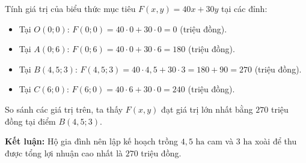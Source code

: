 \documentclass[12pt,a4paper]{article}
\begin{document}
Tính giá trị của biểu thức mục tiêu $F(x, y) = 40x + 30y$ tại các đỉnh:
\begin{itemize}[leftmargin=0.5cm, itemsep=1pt, topsep=1pt]
    \item Tại $O(0; 0)$: $F(0; 0) = 40 \cdot 0 + 30 \cdot 0 = 0$ (triệu đồng).
    \item Tại $A(0; 6)$: $F(0; 6) = 40 \cdot 0 + 30 \cdot 6 = 180$ (triệu đồng).
    \item Tại $B(4{,}5; 3)$: $F(4{,}5; 3) = 40 \cdot 4{,}5 + 30 \cdot 3 = 180 + 90 = 270$ (triệu đồng).
    \item Tại $C(6; 0)$: $F(6; 0) = 40 \cdot 6 + 30 \cdot 0 = 240$ (triệu đồng).
\end{itemize}
So sánh các giá trị trên, ta thấy $F(x, y)$ đạt giá trị lớn nhất bằng $270$ triệu đồng tại điểm $B(4{,}5; 3)$.

\textbf{Kết luận:} Hộ gia đình nên lập kế hoạch trồng $4{,}5\text{ ha}$ cam và $3\text{ ha}$ xoài để thu được tổng lợi nhuận cao nhất là $270$ triệu đồng.
\end{document}
